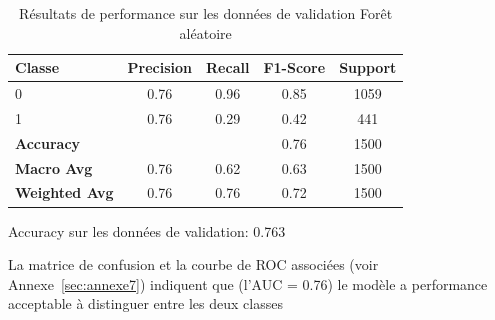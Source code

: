 \begin{table}[h]
\centering
\caption{Résultats de performance sur les données de validation Forêt aléatoire}
\label{tab:performance_validation_FoAl}
\begin{tabular}{|l|c|c|c|c|}
\hline
\textbf{Classe}       & \textbf{Precision} & \textbf{Recall} & \textbf{F1-Score} & \textbf{Support} \\ \hline
0                     & 0.76               & 0.96            & 0.85              & 1059             \\ \hline
1                     & 0.76               & 0.29            & 0.42              & 441              \\ \hline
\textbf{Accuracy} & \multicolumn{2}{|c|}{} & 0.76            & 1500     \\ \hline
\textbf{Macro Avg}    & 0.76               & 0.62            & 0.63              & 1500             \\ \hline
\textbf{Weighted Avg} & 0.76               & 0.76            & 0.72              & 1500             \\ \hline
\end{tabular}
\begin{flushleft}
Accuracy sur les données de validation: 0.763
\end{flushleft}
\end{table}




\begin{flushleft}
La matrice de confusion et la courbe de ROC associées (voir Annexe~\ref{sec:annexe7}) indiquent que (l'AUC = 0.76) le modèle a performance acceptable à distinguer entre les deux classes
\end{flushleft}
 
